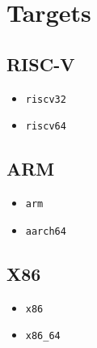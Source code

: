 \chapter{Targets}\label{apendice:target}

\section{RISC-V}

\begin{itemize}
   \item \texttt{riscv32}
   \item \texttt{riscv64}
\end{itemize}

\section{ARM}

\begin{itemize}
   \item \texttt{arm}
   \item \texttt{aarch64}
\end{itemize}

\section{X86}

\begin{itemize}
   \item \texttt{x86}
   \item \texttt{x86\_64}
\end{itemize}